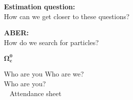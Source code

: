\begin{frame} \Large
    \begin{center}
     \textcolor{LHCbDarkBlue}{\textbf{Estimation question:} }\\ \vspace{1cm}
     How can we get closer to these questions?
    \end{center}\pause 
    \begin{center}  \vspace{1cm}
    \end{center}
\end{frame}

\begin{frame} \Large
    \begin{center}
     \textcolor{LHCbDarkBlue}{\textbf{ABER:} }\\ \vspace{1cm}
     How do we search for particles?
    \end{center}\pause 
    \begin{center}  \vspace{1cm}
    \end{center}
\end{frame}
\begin{frame} \Huge\Huge
    \begin{center}
     \textcolor{LHCbDarkBlue}{$\mathbf{\Omega_c^0}$ }\\ \vspace{1cm}
 \end{center}
\end{frame}


\GroupPresentation \addtocounter{framenumber}{1}



\begin{frame}{Who are you}
\Large Who are we?  \\ \vspace{1cm}
    \Large Who are you? \\ \pause
    \large ~  Attendance sheet
\end{frame}

